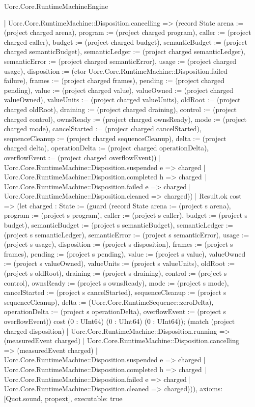 \begin{lexlean}{Uorc.Core.RuntimeMachineEngine}
\begin{semanticmodule}
{      | Uorc.Core.RuntimeMachine::Disposition.cancelling => (record State {arena := (project charged arena), program := (project charged program), caller := (project charged caller), budget := (project charged budget), semanticBudget := (project charged semanticBudget), semanticLedger := (project charged semanticLedger), semanticError := (project charged semanticError), usage := (project charged usage), disposition := (ctor Uorc.Core.RuntimeMachine::Disposition.failed failure), frames := (project charged frames), pending := (project charged pending), value := (project charged value), valueOwned := (project charged valueOwned), valueUnits := (project charged valueUnits), oldRoot := (project charged oldRoot), draining := (project charged draining), control := (project charged control), ownsReady := (project charged ownsReady), mode := (project charged mode), cancelStarted := (project charged cancelStarted), sequenceCleanup := (project charged sequenceCleanup), delta := (project charged delta), operationDelta := (project charged operationDelta), overflowEvent := (project charged overflowEvent)})
      | Uorc.Core.RuntimeMachine::Disposition.suspended e => charged
      | Uorc.Core.RuntimeMachine::Disposition.completed h => charged
      | Uorc.Core.RuntimeMachine::Disposition.failed e => charged
      | Uorc.Core.RuntimeMachine::Disposition.cleaned => charged))
    | Result.ok cost => (let charged : State := (guard (record State {arena := (project s arena), program := (project s program), caller := (project s caller), budget := (project s budget), semanticBudget := (project s semanticBudget), semanticLedger := (project s semanticLedger), semanticError := (project s semanticError), usage := (project s usage), disposition := (project s disposition), frames := (project s frames), pending := (project s pending), value := (project s value), valueOwned := (project s valueOwned), valueUnits := (project s valueUnits), oldRoot := (project s oldRoot), draining := (project s draining), control := (project s control), ownsReady := (project s ownsReady), mode := (project s mode), cancelStarted := (project s cancelStarted), sequenceCleanup := (project s sequenceCleanup), delta := (Uorc.Core.RuntimeSequence::zeroDelta), operationDelta := (project s operationDelta), overflowEvent := (project s overflowEvent)}) cost (0 : UInt64) (0 : UInt64) (0 : UInt64)); (match (project charged disposition)
      | Uorc.Core.RuntimeMachine::Disposition.running => (measuredEvent charged)
      | Uorc.Core.RuntimeMachine::Disposition.cancelling => (measuredEvent charged)
      | Uorc.Core.RuntimeMachine::Disposition.suspended e => charged
      | Uorc.Core.RuntimeMachine::Disposition.completed h => charged
      | Uorc.Core.RuntimeMachine::Disposition.failed e => charged
      | Uorc.Core.RuntimeMachine::Disposition.cleaned => charged))),
  axioms: [Quot.sound, propext],
  executable: true
}


\end{semanticmodule}
\end{lexlean}
